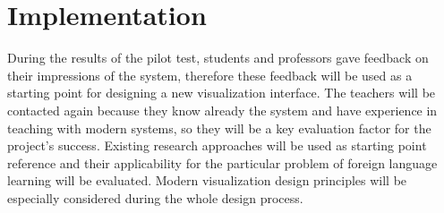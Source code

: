 \chapter{Implementation}\label{p02:implementation}


During the results of the pilot test, students and professors gave feedback on their impressions of the system, therefore these feedback will be used as a starting point for designing a new visualization interface. The teachers will be contacted again because they know already the system and have experience in teaching with modern systems, so they will be a key evaluation factor for the project’s success. 
Existing research approaches will be used as starting point reference and their applicability for the particular problem of foreign language learning will be evaluated. 
Modern visualization design principles will be especially considered during the whole design process.




